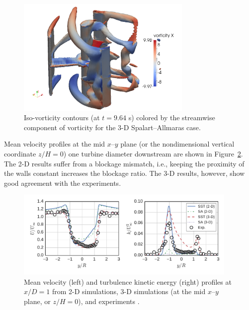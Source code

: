\documentclass[aip,graphicx]{revtex4-1}
\begin{document}
\begin{figure}
    \centering

    \includegraphics[width=0.75\textwidth]{3D_vorticity_SA_964_10-threshold}

    \caption{Iso-vorticity contours (at $t=9.64$ s) colored by the streamwise
        component of vorticity for the 3-D Spalart--Allmaras case.}

    \label{fig:br-vorticity-3d}
\end{figure}

Mean velocity profiles at the mid $x$--$y$ plane (or the nondimensional vertical
coordinate $z/H=0$) one turbine diameter downstream are shown in
Figure~\ref{fig:br-cfd-profiles}. The 2-D results suffer from a blockage
mismatch, i.e., keeping the proximity of the walls constant increases the
blockage ratio. The 3-D results, however, show good agreement with the
experiments.

\begin{figure}
    \centering

    \includegraphics[width=0.95\textwidth]{profiles}

    \caption{Mean velocity (left) and turbulence kinetic energy (right) profiles
    at $x/D=1$ from 2-D simulations, 3-D simulations (at the mid $x$--$y$ plane,
    or $z/H=0$), and experiments \cite{Bachant2015-JoT}.}

    \label{fig:br-cfd-profiles}
\end{figure}
\end{document}
